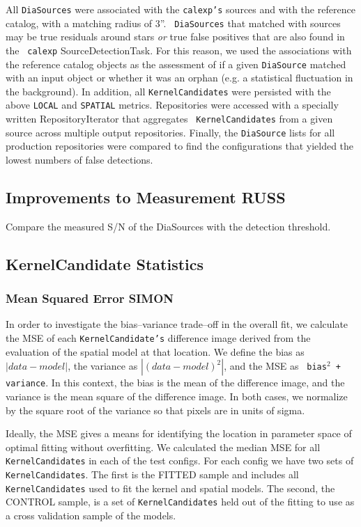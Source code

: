 \documentclass[prd, nofootinbib, floatfix, 11pt,tightenlines,times]{article}
\begin{document}
All {\tt DiaSources} were associated with the {\tt calexp's} sources
and with the reference catalog, with a matching radius of 3''.  {\tt
  DiaSources} that matched with sources may be true residuals around
stars {\it or} true false positives that are also found in the {\tt
  calexp} SourceDetectionTask.  For this reason, we used the
associations with the reference catalog objects as the assessment of
if a given {\tt DiaSource} matched with an input object or whether it
was an orphan (e.g. a statistical fluctuation in the background).  In
addition, all {\tt KernelCandidates} were persisted with the above
{\tt LOCAL} and {\tt SPATIAL} metrics.  Repositories were accessed
with a specially written RepositoryIterator that aggregates {\tt
  KernelCandidates} from a given source across multiple output
repositories.  Finally, the {\tt DiaSource} lists for all production
repositories were compared to find the configurations that yielded the
lowest numbers of false detections.

\subsection{Improvements to Measurement {\bf RUSS} \label{sec-meas}}

Compare the measured S/N of the DiaSources with the detection threshold.

\subsection{KernelCandidate Statistics \label{sec-stats}}

\subsubsection{Mean Squared Error {\bf SIMON}}

In order to investigate the bias--variance trade--off in the overall
fit, we calculate the MSE of each {\tt KernelCandidate's} difference
image derived from the evaluation of the spatial model at that
location.  We define the bias as $\left| data - model \right|$, the
variance as $\left| (data - model)^2 \right|$, and the MSE as {\tt
  bias$^2$ + variance}.  In this context, the bias is the mean of the
difference image, and the variance is the mean square of the
difference image.  In both cases, we normalize by the square root of
the variance so that pixels are in units of sigma.

Ideally, the MSE gives a means for identifying the location in parameter 
space of optimal fitting without overfitting.  We calculated the median MSE
for all {\tt KernelCandidates} in each of the test configs.  For each config
we have two sets of {\tt KernelCandidates}.  The first is the FITTED sample and
includes all {\tt KernelCandidates} used to fit the kernel and spatial models.  The second,
the CONTROL sample, is a set of {\tt KernelCandidates} held out of the fitting
to use as a cross validation sample of the models.
\end{document}
